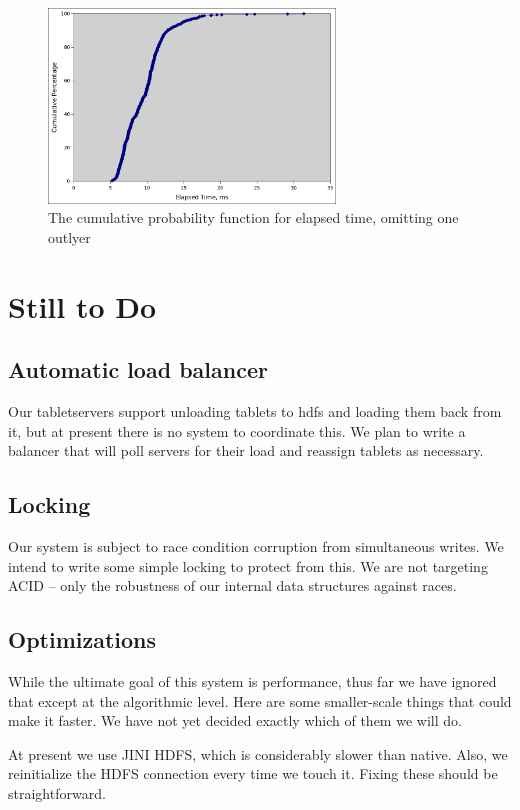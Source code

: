 \documentclass[11pt]{article}
\begin{document}
\begin{figure}
\includegraphics[width=3in]{querytimes}
\caption{The cumulative probability function for elapsed time, omitting one outlyer}
\end{figure}

\section{Still to Do}

\subsection{Automatic load balancer}

Our tabletservers support unloading tablets to hdfs and loading them back from it, but at present there is no system to coordinate this. We plan to write a balancer that will poll servers for their load and reassign tablets as necessary.

\subsection{Locking}

Our system is subject to race condition corruption from simultaneous writes. We intend to write some simple locking to protect from this. We are not targeting ACID -- only the robustness of our internal data structures against races.

\subsection{Optimizations}

While the ultimate goal of this system is performance, thus far we have ignored that except at the algorithmic level. Here are some smaller-scale things that could make it faster. We have not yet decided exactly which of them we will do.


At present we use JINI HDFS, which is considerably slower than native. Also, we reinitialize the HDFS connection every time we touch it. Fixing these should be straightforward.
\end{document}
